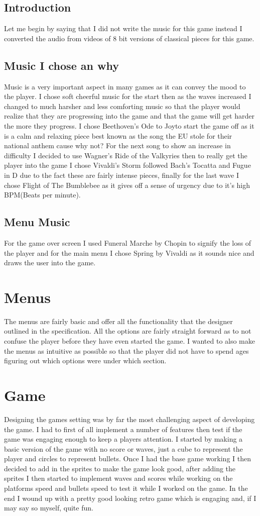 \documentclass{report}
\begin{document}
\subsection{Introduction}
Let me begin by saying that I did not write the music for this game instead I converted the audio from videos of 8 bit versions of classical pieces for this game. 
\subsection{Music I chose an why}
Music is a very important aspect in many games as it can convey the mood to the player.  I chose soft cheerful music for the start then as the waves increased I changed to much harsher and less comforting music so that the player would realize that they are progressing into the game and that the game will get harder the more they progress.  I chose Beethoven's Ode to Joy\cite{Beethoven}to start the game off as it is a calm and relaxing piece best known as the song the EU stole for their national anthem cause why not? For the next song to show an increase in difficulty I decided to use Wagner's Ride of the Valkyries\cite{Wagner} then to really get the player into the game I chose  Vivaldi's Storm\cite{Vivaldi} followed Bach's Tocatta and Fugue in D\cite{Bach} due to the fact these are fairly intense pieces, finally for the last wave I chose Flight of The Bumblebee as it gives off a sense of urgency due to it's high BPM(Beats per minute).
\subsection{Menu Music}
For the game over screen I used Funeral Marche by Chopin\cite{Chopin} to signify the loss of the player and for the main menu I chose Spring by Vivaldi\cite{Vivaldi2} as it sounds nice and draws the user into the game.
\section{Menus}
The menus are fairly basic and offer all the functionality that the designer outlined in the specification.  All the options are fairly straight forward as to not confuse the player before they have even started the game.  I wanted to also make the menus as intuitive as possible so that the player did not have to spend ages figuring out which options were under which section.
\section{Game}
Designing the games setting was by far the most challenging aspect of developing the game.  I had to first of all implement a number of features then test if the game was engaging enough to keep a players attention. I started by making a basic version of the game with no score or waves, just a cube to represent the player and circles to represent bullets. Once I had the base game working I then decided to add in the sprites to make the game look good, after adding the sprites I then started to implement waves and scores while working on the platforms speed and bullets speed to test it while I worked on the game. In the end I wound up with a pretty good looking retro game which is engaging and, if I may say so myself, quite fun.
\end{document}
